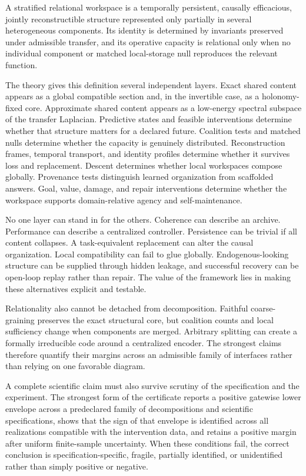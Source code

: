 
A stratified relational workspace is a temporally persistent, causally efficacious, jointly reconstructible
structure represented only partially in several heterogeneous components. Its identity is determined by
invariants preserved under admissible transfer, and its operative capacity is relational only when no
individual component or matched local-storage null reproduces the relevant function.

The theory gives this definition several independent layers. Exact shared content appears as a global
compatible section and, in the invertible case, as a holonomy-fixed core. Approximate shared content
appears as a low-energy spectral subspace of the transfer Laplacian. Predictive states and feasible
interventions determine whether that structure matters for a declared future. Coalition tests and matched
nulls determine whether the capacity is genuinely distributed. Reconstruction frames, temporal transport,
and identity profiles determine whether it survives loss and replacement. Descent determines whether
local workspaces compose globally. Provenance tests distinguish learned organization from scaffolded
answers. Goal, value, damage, and repair interventions determine whether the workspace supports
domain-relative agency and self-maintenance.

No one layer can stand in for the others. Coherence can describe an archive. Performance can describe a
centralized controller. Persistence can be trivial if all content collapses. A task-equivalent replacement
can alter the causal organization. Local compatibility can fail to glue globally. Endogenous-looking
structure can be supplied through hidden leakage, and successful recovery can be open-loop replay rather
than repair. The value of the framework lies in making these alternatives explicit and testable.


Relationality also cannot be detached from decomposition. Faithful
coarse-graining preserves the exact structural core, but coalition counts and
local sufficiency change when components are merged. Arbitrary splitting can
create a formally irreducible code around a centralized encoder. The strongest
claims therefore quantify their margins across an admissible family of
interfaces rather than relying on one favorable diagram.

A complete scientific claim must also survive scrutiny of the specification and the experiment.
The strongest form of the certificate reports a positive gatewise lower envelope across a predeclared
family of decompositions and scientific specifications, shows that the sign of that envelope is identified
across all realizations compatible with the intervention data, and retains a positive margin after uniform
finite-sample uncertainty. When these conditions fail, the correct conclusion is specification-specific,
fragile, partially identified, or unidentified rather than simply positive or negative.


